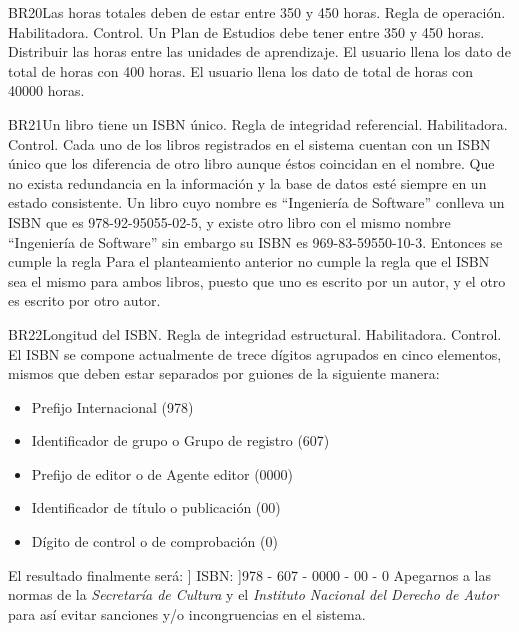 \begin{BussinesRule}{BR20}{Las horas totales deben de estar entre 350 y 450 horas.}
    \BRitem[Tipo: ]Regla de operación.
    \BRitem[Clase: ]Habilitadora.
    \BRitem[Nivel: ]Control.
    \BRitem[Descripción: ]Un Plan de Estudios debe tener entre 350 y 450 horas.
    \BRitem[Motivación:] Distribuir las horas entre las unidades de aprendizaje.
     El usuario llena los dato de total de horas con 400 horas.
     El usuario llena los dato de total de horas con 40000 horas.
\end{BussinesRule}

\begin{BussinesRule}{BR21}{Un libro tiene un ISBN único.}
    \BRitem[Tipo:] Regla de integridad referencial.
    \BRitem[Clase:] Habilitadora.
    \BRitem[Nivel:] Control.
    \BRitem[Descripción:] Cada uno de los libros registrados en el sistema cuentan con un ISBN único que los diferencia de otro libro aunque éstos coincidan en el nombre.
    \BRitem[Motivación:] Que no exista redundancia en la información y la base de datos esté siempre en un estado consistente.
     Un libro cuyo nombre es ``Ingeniería de Software'' conlleva un ISBN que es 978-92-95055-02-5, y existe otro libro con el mismo nombre ``Ingeniería de Software'' sin embargo su ISBN es 969-83-59550-10-3. Entonces se cumple la regla
     Para el planteamiento anterior no cumple la regla que el ISBN sea el mismo para ambos libros, puesto que uno es escrito por un autor, y el otro es escrito por otro autor.
\end{BussinesRule}

\begin{BussinesRule}{BR22}{Longitud del ISBN.}
    \BRitem[Tipo:] Regla de integridad estructural.
    \BRitem[Clase:] Habilitadora.
    \BRitem[Nivel:] Control.
    \BRitem[Descripción:] El ISBN se compone actualmente de trece dígitos agrupados en cinco elementos, mismos que deben estar separados por guiones de la siguiente manera:
    \begin{itemize}
        \item Prefijo Internacional (978)
        \item Identificador de grupo o Grupo de registro (607)
        \item Prefijo de editor o de Agente editor (0000)
        \item Identificador de título o publicación (00)
        \item Dígito de control o de comprobación (0)
    \end{itemize}
El resultado finalmente será: ] ISBN: ]978 - 607 - 0000 - 00 - 0
    \BRitem[Sentencia:]
    \BRitem[Motivación:] Apegarnos a las normas de la \emph{Secretaría de Cultura} y el \emph{Instituto Nacional del Derecho de Autor} para así evitar sanciones y/o incongruencias en el sistema.
\end{BussinesRule}

